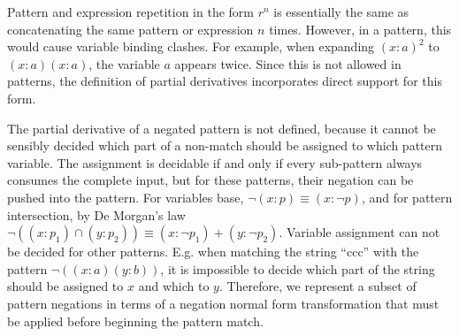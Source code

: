 Pattern and expression repetition in the form $r^n$ is essentially the same as
concatenating the same pattern or expression $n$ times. However, in a pattern,
this would cause variable binding clashes. For example, when expanding
$(x:a)^2$ to $(x:a)(x:a)$, the variable $a$ appears twice. Since this is not
allowed in patterns, the definition of partial derivatives incorporates direct
support for this form.

The partial derivative of a negated pattern is not defined, because it cannot
be sensibly decided which part of a non-match should be assigned to which
pattern variable. The assignment is decidable if and only if every sub-pattern
always consumes the complete input, but for these patterns, their negation can
be pushed into the pattern. For variables base, $\neg(x:p) \equiv (x:\neg p)$,
and for pattern intersection, by De Morgan's law $\neg((x:p_1) \cap (y:p_2))
\equiv (x:\neg p_1) + (y:\neg p_2)$. Variable assignment can not be decided
for other patterns. E.g. when matching the string ``ccc'' with the pattern
$\neg((x:a)(y:b))$, it is impossible to decide which part of the string should
be assigned to $x$ and which to $y$. Therefore, we represent a subset of
pattern negations in terms of a negation normal form transformation that must
be applied before beginning the pattern match.

\needspace{4cm}

